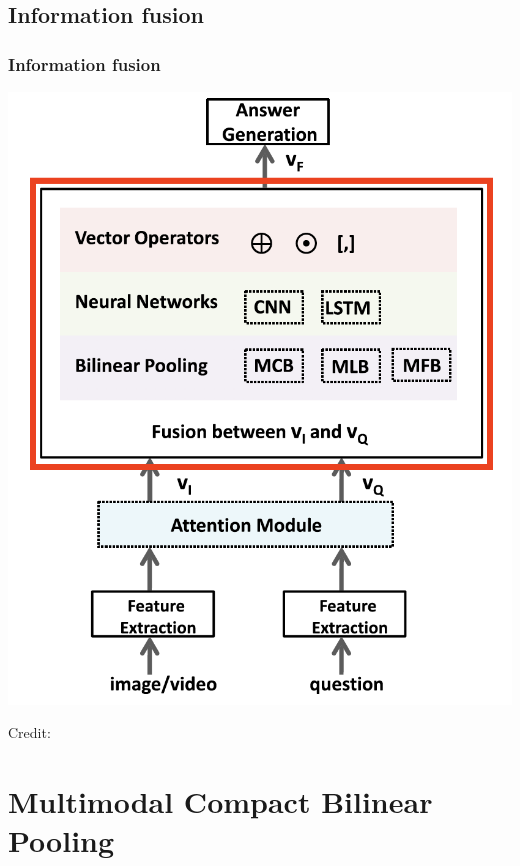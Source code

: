 \documentclass{beamer}
\begin{document}
\subsection{Information fusion}
\begin{frame}
\frametitle{Information fusion}
\begin{center}
\includegraphics[scale=0.35]{./images/InformationFusion}
\end{center}
\begin{center}
\hspace*{12pt}\hbox{\scriptsize Credit:}
\end{center}
\end{frame}


\section{Multimodal Compact Bilinear Pooling} 
\end{document}
